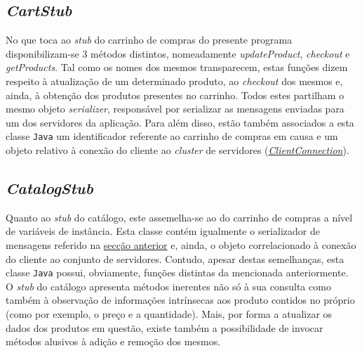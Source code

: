 \documentclass[a4paper]{report}
\begin{document}
{		\subsection{\textit{CartStub}} \label{subsec:ClientCartStub}
		No que toca ao \textit{stub} do carrinho de compras do presente programa disponibilizam-se 3 métodos distintos, nomeadamente \textit{updateProduct}, \textit{checkout} e \textit{getProducts}.
		Tal como os nomes dos mesmos transparecem, estas funções dizem respeito à atualização de um determinado produto, ao \textit{checkout} dos mesmos e, ainda, à obtenção dos produtos presentes no carrinho.
		Todos estes partilham o mesmo objeto \textit{serializer}, responsável por serializar as mensagens enviadas para um dos servidores da aplicação.
		Para além disso, estão também associados a esta classe \texttt{Java} um identificador referente ao carrinho de compras em causa e um objeto relativo à conexão do cliente ao \textit{cluster} de servidores (\hyperref[subsec:ClientConnection]{\textit{ClientConnection}}).

		\subsection{\textit{CatalogStub}} \label{subsec:ClientCatalogStub}
		Quanto ao \textit{stub} do catálogo, este assemelha-se ao do carrinho de compras a nível de variáveis de instância. Esta classe contém igualmente o serializador de mensagens referido na \hyperref[subsec:ClientCartStub]{secção anterior} e, ainda, o objeto correlacionado à conexão do cliente ao conjunto de servidores.
		Contudo, apesar destas semelhanças, esta classe \texttt{Java} possui, obviamente, funções distintas da mencionada anteriormente.
		O \textit{stub} do catálogo apresenta métodos inerentes não só à sua consulta como também à observação de informações intrínsecas aos produto contidos no próprio (como por exemplo, o preço e a quantidade).
		Mais, por forma a atualizar os dados dos produtos em questão, existe também a possibilidade de invocar métodos alusivos à adição e remoção dos mesmos.
}
\end{document}
